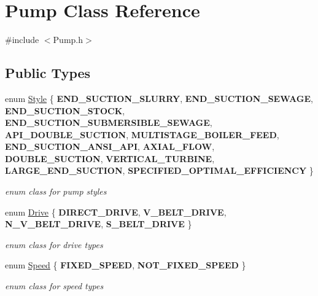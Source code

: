 \hypertarget{class_pump}{}\section{Pump Class Reference}
\label{class_pump}


{\ttfamily \#include $<$Pump.\+h$>$}

\subsection*{Public Types}
\begin{DoxyCompactItemize}
\item 
\mbox{\label{class_pump_aef354601ce4218258cc898b35a1e90ff}} 
enum \hyperlink{class_pump_aef354601ce4218258cc898b35a1e90ff}{Style} \{ \newline
{\bfseries E\+N\+D\+\_\+\+S\+U\+C\+T\+I\+O\+N\+\_\+\+S\+L\+U\+R\+RY}, 
{\bfseries E\+N\+D\+\_\+\+S\+U\+C\+T\+I\+O\+N\+\_\+\+S\+E\+W\+A\+GE}, 
{\bfseries E\+N\+D\+\_\+\+S\+U\+C\+T\+I\+O\+N\+\_\+\+S\+T\+O\+CK}, 
{\bfseries E\+N\+D\+\_\+\+S\+U\+C\+T\+I\+O\+N\+\_\+\+S\+U\+B\+M\+E\+R\+S\+I\+B\+L\+E\+\_\+\+S\+E\+W\+A\+GE}, 
\newline
{\bfseries A\+P\+I\+\_\+\+D\+O\+U\+B\+L\+E\+\_\+\+S\+U\+C\+T\+I\+ON}, 
{\bfseries M\+U\+L\+T\+I\+S\+T\+A\+G\+E\+\_\+\+B\+O\+I\+L\+E\+R\+\_\+\+F\+E\+ED}, 
{\bfseries E\+N\+D\+\_\+\+S\+U\+C\+T\+I\+O\+N\+\_\+\+A\+N\+S\+I\+\_\+\+A\+PI}, 
{\bfseries A\+X\+I\+A\+L\+\_\+\+F\+L\+OW}, 
\newline
{\bfseries D\+O\+U\+B\+L\+E\+\_\+\+S\+U\+C\+T\+I\+ON}, 
{\bfseries V\+E\+R\+T\+I\+C\+A\+L\+\_\+\+T\+U\+R\+B\+I\+NE}, 
{\bfseries L\+A\+R\+G\+E\+\_\+\+E\+N\+D\+\_\+\+S\+U\+C\+T\+I\+ON}, 
{\bfseries S\+P\+E\+C\+I\+F\+I\+E\+D\+\_\+\+O\+P\+T\+I\+M\+A\+L\+\_\+\+E\+F\+F\+I\+C\+I\+E\+N\+CY}
 \}\begin{DoxyCompactList}\small\item\em enum class for pump styles \end{DoxyCompactList}
\item 
\mbox{\label{class_pump_a32bf0ade131a11bb3b3fb374f638e983}} 
enum \hyperlink{class_pump_a32bf0ade131a11bb3b3fb374f638e983}{Drive} \{ {\bfseries D\+I\+R\+E\+C\+T\+\_\+\+D\+R\+I\+VE}, 
{\bfseries V\+\_\+\+B\+E\+L\+T\+\_\+\+D\+R\+I\+VE}, 
{\bfseries N\+\_\+\+V\+\_\+\+B\+E\+L\+T\+\_\+\+D\+R\+I\+VE}, 
{\bfseries S\+\_\+\+B\+E\+L\+T\+\_\+\+D\+R\+I\+VE}
 \}\begin{DoxyCompactList}\small\item\em enum class for drive types \end{DoxyCompactList}
\item 
\mbox{\label{class_pump_ae443603074ebca82f0b89209482d10b6}} 
enum \hyperlink{class_pump_ae443603074ebca82f0b89209482d10b6}{Speed} \{ {\bfseries F\+I\+X\+E\+D\+\_\+\+S\+P\+E\+ED}, 
{\bfseries N\+O\+T\+\_\+\+F\+I\+X\+E\+D\+\_\+\+S\+P\+E\+ED}
 \}\begin{DoxyCompactList}\small\item\em enum class for speed types \end{DoxyCompactList}
\end{DoxyCompactItemize}
